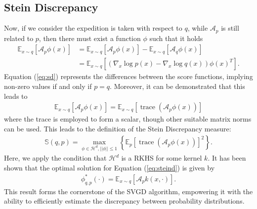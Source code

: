 \documentclass[11pt]{isr} %
\newcommand{\so}{\mathcal{A}}
\newcommand{\hh}{\mathcal{H}^d}
\newcommand{\ee}[1]{\mathbb{E}_{x \sim #1}}
\DeclareMathOperator{\trace}{trace}
\begin{document}
\subsection*{Stein Discrepancy}
Now, if we consider the expedition is taken with respect to $q$, while $\mathcal{A}_p$ is still related to $p$, then there must exist a function $\phi$ such that it holds
\begin{align}
  \mathbb{E}_{x \sim q} \left[ \so_p \phi(x) \right] &= \ee{q} \left[ \so_p \phi(x)  \right] - \ee{q} \left[ \so_q \phi(x)  \right] \\  &= \ee{q} \left[ \left( \nabla_x \log p(x) - \nabla_x \log q(x)  \right) \phi(x)^{T} \right].
  \label{eq:sd}
\end{align}
Equation (\ref{eq:sd}) represents the differences between the score functions, implying non-zero values if and only if $p = q$.
Moreover, it can be demonstrated \cite{gorham2019measuring} that this leads to
\begin{align*}
  \ee{q} \left[ \so_p \phi(x) \right] = \ee{q} \left[  \trace( \so_p \phi(x) ) \right]
\end{align*}
where the trace is employed to form a scalar, though other suitable matrix norms can be used. This leads to the definition of the Stein Discrepancy measure:
\begin{align}
  \mathbb{S}(q,p) = \max_{\phi \in \mathcal{H}^d , || \phi || \leq 1} \left\{ \mathbb{E}_p \left[ \trace( \mathcal{A}_p \phi(x)) \right]^{2} \right\}. 
  \label{eq:steind}
\end{align}
Here, we apply the condition that $\hh$ is a RKHS for some kernel $k$. It has been shown \cite{liu2016kernelized} that the optimal solution for Equation (\ref{eq:steind}) is given by
\begin{align}
  \phi_{q,p}^{*}(\cdot) = \ee{q} \left[ \so_p k(x, \cdot) \right].
  \label{eq:opt_steinD}
\end{align}
This result forms the cornerstone of the SVGD algorithm, empowering it with the ability to efficiently estimate the discrepancy between probability distributions.
\end{document}
